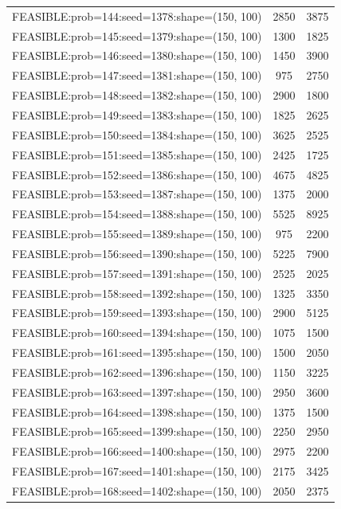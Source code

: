 \begin{longtable}{lcc}
FEASIBLE:prob=144:seed=1378:shape=(150, 100) &     2850 &  3875 \\
FEASIBLE:prob=145:seed=1379:shape=(150, 100) &     1300 &  1825 \\
FEASIBLE:prob=146:seed=1380:shape=(150, 100) &     1450 &  3900 \\
FEASIBLE:prob=147:seed=1381:shape=(150, 100) &      975 &  2750 \\
FEASIBLE:prob=148:seed=1382:shape=(150, 100) &     2900 &  1800 \\
FEASIBLE:prob=149:seed=1383:shape=(150, 100) &     1825 &  2625 \\
FEASIBLE:prob=150:seed=1384:shape=(150, 100) &     3625 &  2525 \\
FEASIBLE:prob=151:seed=1385:shape=(150, 100) &     2425 &  1725 \\
FEASIBLE:prob=152:seed=1386:shape=(150, 100) &     4675 &  4825 \\
FEASIBLE:prob=153:seed=1387:shape=(150, 100) &     1375 &  2000 \\
FEASIBLE:prob=154:seed=1388:shape=(150, 100) &     5525 &  8925 \\
FEASIBLE:prob=155:seed=1389:shape=(150, 100) &      975 &  2200 \\
FEASIBLE:prob=156:seed=1390:shape=(150, 100) &     5225 &  7900 \\
FEASIBLE:prob=157:seed=1391:shape=(150, 100) &     2525 &  2025 \\
FEASIBLE:prob=158:seed=1392:shape=(150, 100) &     1325 &  3350 \\
FEASIBLE:prob=159:seed=1393:shape=(150, 100) &     2900 &  5125 \\
FEASIBLE:prob=160:seed=1394:shape=(150, 100) &     1075 &  1500 \\
FEASIBLE:prob=161:seed=1395:shape=(150, 100) &     1500 &  2050 \\
FEASIBLE:prob=162:seed=1396:shape=(150, 100) &     1150 &  3225 \\
FEASIBLE:prob=163:seed=1397:shape=(150, 100) &     2950 &  3600 \\
FEASIBLE:prob=164:seed=1398:shape=(150, 100) &     1375 &  1500 \\
FEASIBLE:prob=165:seed=1399:shape=(150, 100) &     2250 &  2950 \\
FEASIBLE:prob=166:seed=1400:shape=(150, 100) &     2975 &  2200 \\
FEASIBLE:prob=167:seed=1401:shape=(150, 100) &     2175 &  3425 \\
FEASIBLE:prob=168:seed=1402:shape=(150, 100) &     2050 &  2375 \\

\end{longtable}
